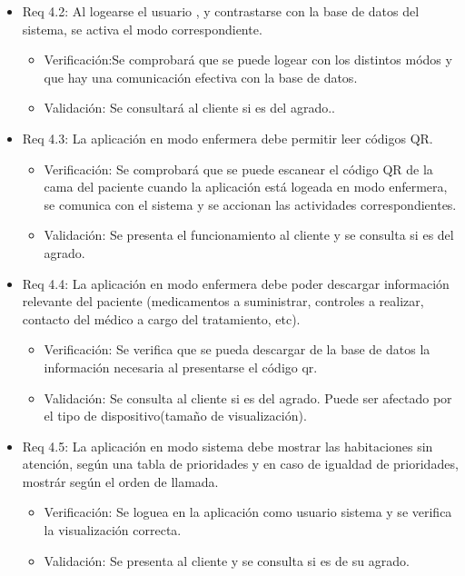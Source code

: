 \documentclass[
11pt, %
]{charter}
\begin{document}
\begin{itemize}
\item Req 4.2: Al logearse el usuario , y contrastarse con la base de datos del sistema, se activa el modo correspondiente.
	\begin{itemize}
	\item Verificación:Se comprobará que se puede logear con los distintos módos y que hay una comunicación efectiva con la base de datos.
	\item Validación: Se consultará al cliente si es del agrado..
	\end{itemize}		

\item Req 4.3: La aplicación en modo enfermera debe permitir leer códigos QR.
	\begin{itemize}
	\item Verificación: Se comprobará que se puede escanear el código QR de la cama del paciente cuando la aplicación está logeada en modo enfermera, se comunica con el sistema y se accionan las actividades correspondientes.
	\item Validación:  Se presenta el funcionamiento al cliente y se consulta si es del agrado.
	\end{itemize}		

\item Req 4.4: La aplicación en modo enfermera debe poder descargar información relevante del paciente (medicamentos a suministrar, controles a realizar, contacto del médico a cargo del tratamiento, etc).	
	\begin{itemize}
	\item Verificación: Se verifica que se pueda descargar de la base de datos la información necesaria al presentarse el código qr.
	\item Validación:  Se consulta al cliente si es del agrado. Puede ser afectado por el tipo de dispositivo(tamaño de visualización).
	\end{itemize}		

\item Req 4.5: La aplicación en modo sistema debe mostrar las habitaciones sin atención, según una tabla de prioridades y en caso de igualdad de prioridades, mostrár según el orden de llamada.
	\begin{itemize}
	\item Verificación: Se loguea en la aplicación como usuario sistema y se verifica la visualización correcta.
	\item Validación:  Se presenta al cliente y se consulta si es de su agrado.
	\end{itemize}		



\end{itemize}
\end{document}
